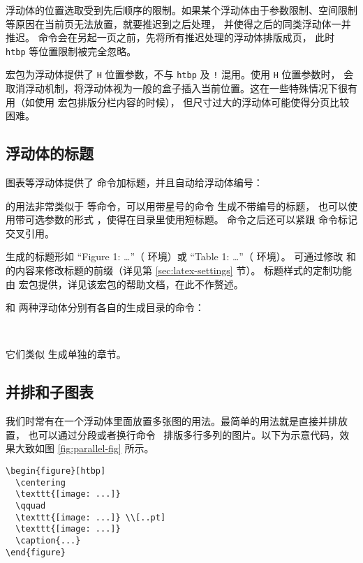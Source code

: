 浮动体的位置选取受到先后顺序的限制。如果某个浮动体由于参数限制、空间限制等原因在当前页无法放置，就要推迟到之后处理，
并使得之后的同类浮动体一并推迟。 命令会在另起一页之前，先将所有推迟处理的浮动体排版成页，
此时 \texttt{htbp} 等位置限制被完全忽略。


 宏包为浮动体提供了 \texttt{H} 位置参数，不与 \texttt{htbp} 及 \texttt{!} 混用。使用 \texttt{H} 位置参数时，
会取消浮动机制，将浮动体视为一般的盒子插入当前位置。这在一些特殊情况下很有用（如使用  宏包排版分栏内容的时候），
但尺寸过大的浮动体可能使得分页比较困难。

\subsection{浮动体的标题}\label{subsec:caption}

图表等浮动体提供了  命令加标题，并且自动给浮动体编号：
\begin{command}
\marg*{\ldots}
\end{command}
 的用法非常类似于  等命令，可以用带星号的命令  生成不带编号的标题，
也可以使用带可选参数的形式 \oarg*{\ldots}\marg*{\ldots}，使得在目录里使用短标题。
 命令之后还可以紧跟  命令标记交叉引用。

 生成的标题形如 ``Figure 1: \ldots''{}（ 环境）或 ``Table 1: \ldots''{}（ 环境）。
可通过修改  和  的内容来修改标题的前缀（详见第 \ref{sec:latex-settings} 节）。
标题样式的定制功能由  宏包提供，详见该宏包的帮助文档，在此不作赘述。

 和  两种浮动体分别有各自的生成目录的命令：
\begin{command}
 \\
\end{command}

它们类似  生成单独的章节。

\subsection{并排和子图表}\label{subsec:subfig}

我们时常有在一个浮动体里面放置多张图的用法。最简单的用法就是直接并排放置，
也可以通过分段或者换行命令 \crcmd\ 排版多行多列的图片。以下为示意代码，效果大致如图 \ref{fig:parallel-fig} 所示。
\begin{verbatim}
\begin{figure}[htbp]
  \centering
  \texttt{[image: ...]}
  \qquad
  \texttt{[image: ...]} \\[..pt]
  \texttt{[image: ...]}
  \caption{...}
\end{figure}
\end{verbatim}

